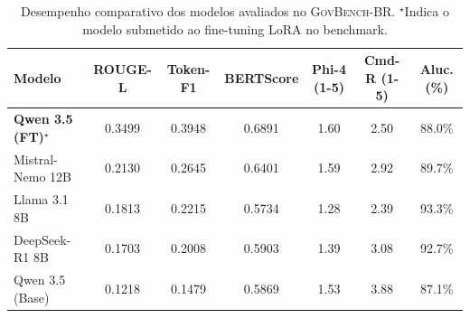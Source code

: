 \begin{table}[t]
\centering
\small
\begin{tabular}{lcccccc}
\toprule
\textbf{Modelo} & \textbf{ROUGE-L} & \textbf{Token-F1} & \textbf{BERTScore} & \textbf{Phi-4 (1-5)} & \textbf{Cmd-R (1-5)} & \textbf{Aluc. (\%)} \\
\midrule
\textbf{Qwen 3.5 (FT)}$^\star$ & 0.3499 & 0.3948 & 0.6891 & 1.60 & 2.50 & 88.0\% \\
Mistral-Nemo 12B & 0.2130 & 0.2645 & 0.6401 & 1.59 & 2.92 & 89.7\% \\
Llama 3.1 8B & 0.1813 & 0.2215 & 0.5734 & 1.28 & 2.39 & 93.3\% \\
DeepSeek-R1 8B & 0.1703 & 0.2008 & 0.5903 & 1.39 & 3.08 & 92.7\% \\
Qwen 3.5 (Base) & 0.1218 & 0.1479 & 0.5869 & 1.53 & 3.88 & 87.1\% \\
\bottomrule
\end{tabular}
\caption{Desempenho comparativo dos modelos avaliados no \textsc{GovBench-BR}. $^\star$Indica o modelo submetido ao fine-tuning LoRA no benchmark.}
\label{tab:govbench_overall_results}
\end{table}
